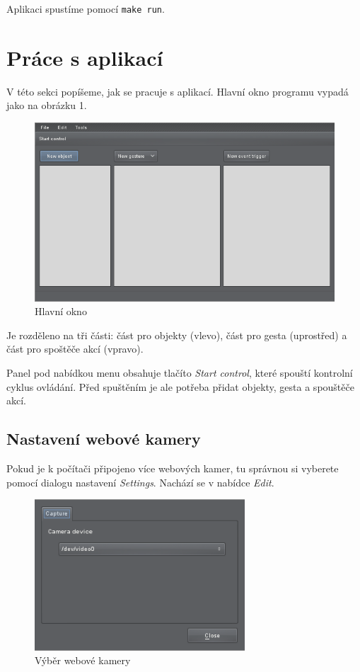 Aplikaci spustíme pomocí \texttt{make run}.

\section{Práce s aplikací}
V této sekci popíšeme, jak se pracuje s aplikací. Hlavní okno programu vypadá
jako na obrázku 1.

\begin{figure}[h]
\centering
\includegraphics[width=\textwidth]{mainwindow.png}
\caption{Hlavní okno}
\end{figure}

Je rozděleno na tři části: část pro objekty (vlevo), část pro gesta
(uprostřed) a část pro spoštěče akcí (vpravo).

Panel pod nabídkou menu obsahuje tlačíto \emph{Start control}, které spouští
kontrolní cyklus ovládání. Před spuštěním je ale potřeba přidat objekty, gesta
a spouštěče akcí.

\subsection{Nastavení webové kamery}
Pokud je k počítači připojeno více webových kamer, tu správnou si vyberete
pomocí dialogu nastavení \emph{Settings}. Nachází se v nabídce \emph{Edit}.

\begin{figure}[h]
\centering
\includegraphics[width=0.7\textwidth]{settings.png}
\caption{Výběr webové kamery}
\end{figure}

